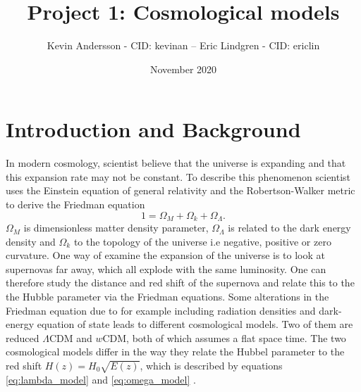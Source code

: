 \documentclass[11pt,a4paper]{article}
\title{Project 1: Cosmological models}
\author{Kevin Andersson - CID: kevinan -- Eric Lindgren - CID: ericlin}
\date{November 2020}
\begin{document}
\maketitle
{}%
\clearpage

\setcounter{page}{1}
\section{Introduction and Background}
In modern cosmology, scientist believe that the universe is expanding and that this expansion rate may not be constant. To describe this phenomenon scientist uses the Einstein equation of general relativity and the Robertson-Walker metric to derive the Friedman equation 
\begin{equation}
    \label{eq:friedman}
    1 = \Omega_{M} + \Omega_{k} + \Omega_{\Lambda}.
\end{equation}
$\Omega_M$ is dimensionless matter density parameter, $\Omega_\Lambda$ is related to the dark energy density and $\Omega_k$ to the topology of the universe i.e negative, positive or zero curvature. One way of examine the expansion of the universe is to look at supernovas far away, which all explode with the same luminosity. One can therefore study the distance and red shift of the supernova and relate this to the the Hubble parameter via the Friedman equations. Some alterations in the Friedman equation due to for example including radiation densities and dark-energy equation of state leads to different cosmological models. Two of them are reduced $\Lambda$CDM and $w$CDM, both of which assumes a flat space time. The two cosmological models differ in the way they relate the Hubbel parameter to the red shift $H(z) = H_0\sqrt{E(z)}$, which is described by equations \eqref{eq:lambda_model} and \eqref{eq:omega_model} \cite{project_pm}.

\end{document}
